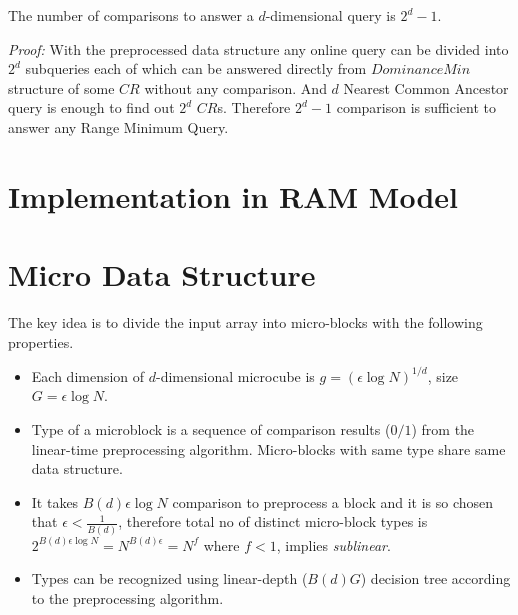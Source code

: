 \begin{theorem}
The number of comparisons to answer a $d$-dimensional query is $2^d-1$.
\end{theorem}
\emph{Proof:} With the preprocessed data structure any online query can be divided into $2^d$ subqueries each of which can be answered directly from $DominanceMin$ structure of some $CR$ without any comparison. And $d$ Nearest Common Ancestor query is enough to find out $2^d$ $CR$s. Therefore $2^d-1$ comparison is sufficient to answer any Range Minimum Query.
\section{Implementation in RAM Model}
\section{Micro Data Structure}
The key idea is to divide the input array into micro-blocks with the following properties. 
\compress
\begin{itemize} \itemsep1pt \parskip0pt 
\item Each dimension of $d$-dimensional microcube is $g=(\epsilon\log N)^{1/d}$, size $G=\epsilon\log N$.
\item Type of a microblock is a sequence of comparison results ($0/1$) from the linear-time preprocessing algorithm. Micro-blocks with same type share same data structure.
\item It takes $B(d)\epsilon\log N$ comparison to preprocess a block and it is so chosen that $\epsilon < \frac{1}{B(d)}$, therefore total no of distinct micro-block types is $2^{B(d)\epsilon\log N} = N^{B(d)\epsilon} = N^f$ where $f < 1$, implies \emph{sublinear}.
\item Types can be recognized using linear-depth ($B(d)G$) decision tree according to the preprocessing algorithm.
\end{itemize}
